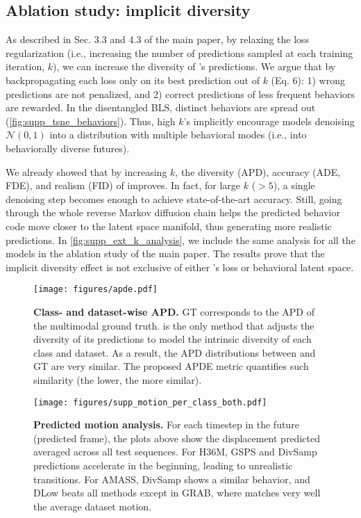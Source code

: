 \documentclass[10pt,twocolumn,letterpaper]{article}
\begin{document}
\subsection{Ablation study: implicit diversity} 
\label{subsec:supp_extended_k}

As described in Sec. 3.3 and 4.3 of the main paper, by relaxing the loss regularization (i.e., increasing the number of predictions sampled at each training iteration, $k$), we can increase the diversity of \modelname{}'s predictions. We argue that by backpropagating each loss only on its best prediction out of $k$ (Eq. 6): 1) wrong predictions are not penalized, and 2) correct predictions of less frequent behaviors are rewarded. In the disentangled BLS, distinct behaviors are spread out (\autoref{fig:supp_tsne_behaviors}). Thus, high $k$'s implicitly encourage models denoising $\mathcal{N}(0, 1)$ into a distribution with multiple behavioral modes (i.e., into behaviorally diverse futures).

We already showed that by increasing $k$, the diversity (APD), accuracy (ADE, FDE), and realism (FID) of \modelname{} improves. In fact, for large $k$ ($>5$), a single denoising step becomes enough to achieve state-of-the-art accuracy. Still, going through the whole reverse Markov diffusion chain helps the predicted behavior code move closer to the latent space manifold, thus generating more realistic predictions. In \autoref{fig:supp_ext_k_analysis}, we include the same analysis for all the models in the ablation study of the main paper. The results prove that the implicit diversity effect is not exclusive of either \modelname{}'s loss or behavioral latent space. 




\begin{figure*}[t!]
    \centering
    \texttt{[image: figures/apde.pdf]}
    \caption{\textbf{Class- and dataset-wise APD. }GT corresponds to the APD of the multimodal ground truth. \modelname{} is the only method that adjusts the diversity of its predictions to model the intrinsic diversity of each class and dataset. As a result, the APD distributions between \modelname{} and GT are very similar. The proposed APDE metric quantifies such similarity (the lower, the more similar).}
    \label{fig:supp_apde}
\end{figure*}

\begin{figure*}
    \centering
    \texttt{[image: figures/supp\_motion\_per\_class\_both.pdf]}
    \caption{\textbf{Predicted motion analysis. } For each timestep in the future (predicted frame), the plots above show the displacement predicted averaged across all test sequences. For H36M, GSPS and DivSamp predictions accelerate in the beginning, leading to unrealistic transitions. For AMASS, DivSamp shows a similar behavior, and DLow beats all methods except in GRAB, where \modelname{} matches very well the average dataset motion.}
    \label{fig:supp_supp_cmd}
\end{figure*}
\end{document}
